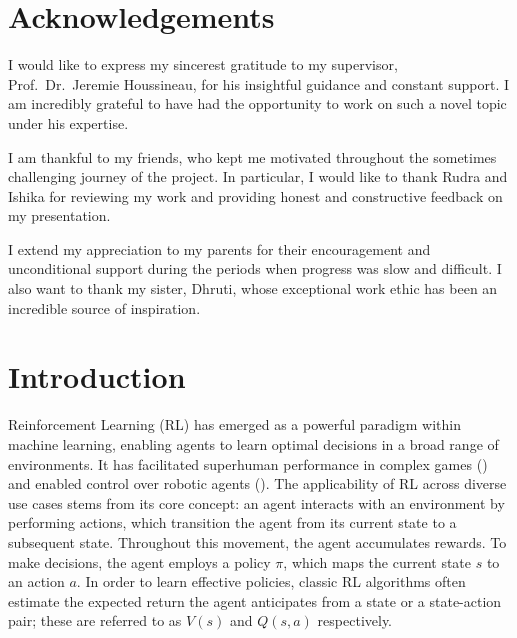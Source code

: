 \documentclass[11pt,a4paper]{report}
\begin{document}
\chapter*{Acknowledgements}
I would like to express my sincerest gratitude to my supervisor, Prof.\ Dr.\ Jeremie Houssineau, for his insightful guidance and constant support. I am incredibly grateful to have had the opportunity to work on such a novel topic under his expertise. \par

I am thankful to my friends, who kept me motivated throughout the sometimes challenging journey of the project. In particular, I would like to thank Rudra and Ishika for reviewing my work and providing honest and constructive feedback on my presentation. \par

I extend my appreciation to my parents for their encouragement and unconditional support during the periods when progress was slow and difficult. I also want to thank my sister, Dhruti, whose exceptional work ethic has been an incredible source of inspiration. \par



\tableofcontents




\chapter{Introduction}
Reinforcement Learning (RL) has emerged as a powerful paradigm within machine learning, enabling agents to learn optimal decisions in a broad range of environments. It has facilitated superhuman performance in complex games (\cite{silver2017masteringchessshogiselfplay}) and enabled control over robotic agents (\cite{Liu_2021}). The applicability of RL across diverse use cases stems from its core concept: an agent interacts with an environment by performing actions, which transition the agent from its current state to a subsequent state. Throughout this movement, the agent accumulates rewards. To make decisions, the agent employs a policy $\pi$, which maps the current state $s$ to an action $a$. In order to learn effective policies, classic RL algorithms often estimate the expected return the agent anticipates from a state or a state-action pair; these are referred to as $V(s)$ and $Q(s,a)$ respectively.
\end{document}

